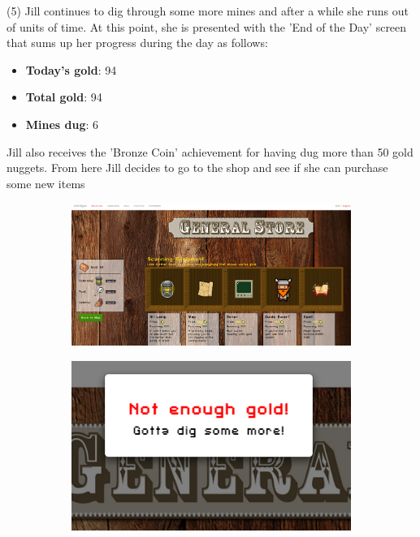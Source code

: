 \documentclass{mproj}
\begin{document}
(5) Jill continues to dig through some more mines and after a while she runs out of units of time. At this point, she is presented with the 'End of the Day' screen that sums up her progress during the day as follows:
\begin{itemize}
	\item \textbf{Today's gold}: 94 
  	\item \textbf{Total gold}: 94
  	\item \textbf{Mines dug}: 6 
\end{itemize} 
Jill also receives the 'Bronze Coin' achievement for having dug more than 50 gold nuggets. From here Jill decides to go to the shop and see if she can purchase some new items

\begin{figure}[!h]
        \centering
        \begin{subfigure} [h] {0.6\textwidth}
                \centering
                \includegraphics [width=1\textwidth] {generalstore.png}
        \end{subfigure}
        \space
        \space
        \begin{subfigure} [h] {0.3\textwidth}
                \centering
                \includegraphics [width=1\textwidth] {nogold.png}
        \end{subfigure}
\end{figure}
\end{document}
